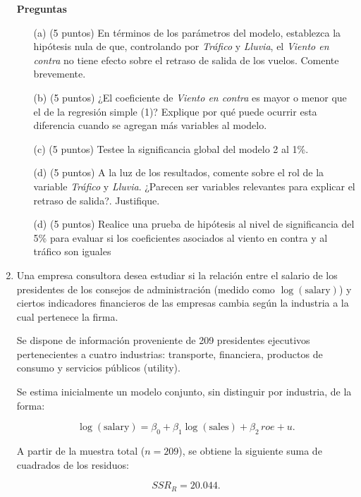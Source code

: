 \documentclass[10pt,a4paper]{article}
\begin{document}
\begin{enumerate}
\textbf{Preguntas}
\begin{enumerate}

    \item[(a)] (5 puntos) En términos de los parámetros del modelo, establezca la hipótesis nula de que, controlando por \textit{Tráfico} y \textit{Lluvia}, el \textit{Viento en contra} no tiene efecto sobre el retraso de salida de los vuelos. Comente brevemente.

    \item[(b)] (5 puntos) ¿El coeficiente de \textit{Viento en contra} es mayor o menor que el de la regresión simple (1)? Explique por qué puede ocurrir esta diferencia cuando se agregan más variables al modelo.

    \item[(c)] (5 puntos) Testee la significancia global del modelo 2 al 1\%.

    \item[(d)] (5 puntos) A la luz de los resultados, comente sobre el rol de la variable \textit{Tráfico} y \textit{Lluvia}. ¿Parecen ser variables relevantes para explicar el retraso de salida?. Justifique.

  \item[(d)] (5 puntos) Realice una prueba de hipótesis al nivel de significancia del 5\% para evaluar si los coeficientes asociados al viento en contra y al tráfico son iguales
\end{enumerate}





    \item  Una empresa consultora desea estudiar si la relación entre el salario de los presidentes de los 
consejos de administración (medido como $\log(\text{salary})$) y ciertos indicadores financieros 
de las empresas cambia según la industria a la cual pertenece la firma.

Se dispone de información proveniente de 209 presidentes ejecutivos pertenecientes a cuatro 
industrias: transporte, financiera, productos de consumo y servicios públicos (utility).

Se estima inicialmente un modelo conjunto, sin distinguir por industria, de la forma:

\[
\log(\text{salary}) = \beta_0 + \beta_1 \log(\text{sales}) + \beta_2 \, roe + u.
\]

A partir de la muestra total ($n = 209$), se obtiene la siguiente suma de cuadrados de los residuos:

\[
SSR_R = 20.044.
\]


\end{enumerate}
\end{document}

